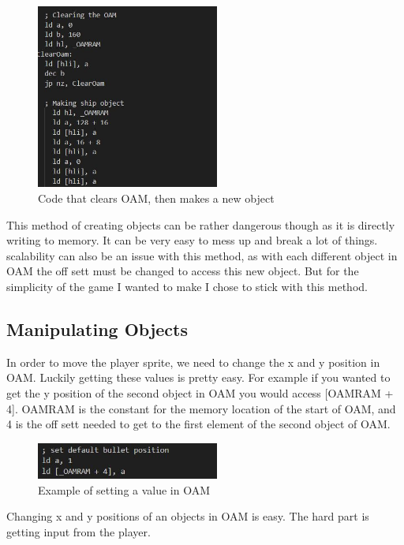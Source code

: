 \documentclass{article}
\begin{document}
\begin{figure}[htp]
    \centering
    \includegraphics[width=6cm]{images/OAMExample.JPG}
    \caption{Code that clears OAM, then makes a new object}
    \label{OAM example code}
\end{figure}

This method of creating objects can be rather dangerous though as it is directly writing to memory. It can be very easy to mess up and break a lot of things. scalability can also be an issue with this method, as with each different object in OAM the off sett must be changed to access this new object. But for the simplicity of the game I wanted to make I chose to stick with this method.

\subsection{Manipulating Objects}

In order to move the player sprite, we need to change the x and y position in OAM. Luckily getting these values is pretty easy. For example if you wanted to get the y position of the second object in OAM you would access [OAMRAM + 4]. OAMRAM is the constant for the memory location of the start of OAM, and 4 is the off sett needed to get to the first element of the second object of OAM.

\begin{figure}[htp]
    \centering
    \includegraphics[width=6cm]{images/settingValueInOAM.JPG}
    \caption{Example of setting a value in OAM}
    \label{More OAM example code}
\end{figure}

Changing x and y positions of an objects in OAM is easy. The hard part is getting input from the player.
\end{document}
